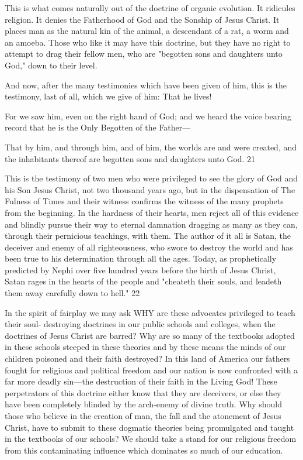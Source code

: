 This is what comes naturally out of the doctrine of organic evolution. It ridicules religion. It
denies the Fatherhood of God and the Sonship of Jesus Christ. It places man as the natural
kin of the animal, a descendant of a rat, a worm and an amoeba. Those who like it may have
this doctrine, but they have no right to attempt to drag their fellow men, who are "begotten
sons and daughters unto God," down to their level.

And now, after the many testimonies which have been given of him, this is the testimony,
last of all, which we give of him: That he lives!

For we saw him, even on the right hand of God; and we heard the voice bearing record that
he is the Only Begotten of the Father—

That by him, and through him, and of him, the worlds are and were created, and the
inhabitants thereof are begotten sons and daughters unto God. 21

This is the testimony of two men who were privileged to see the glory of God and his Son
Jesus Christ, not two thousand years ago, but in the dispensation of The Fulness of Times and
their witness confirms the witness of the many prophets from the beginning. In the hardness
of their hearts, men reject all of this evidence and blindly pursue their way to eternal
damnation dragging as many as they can, through their pernicious teachings, with them. The
author of it all is Satan, the deceiver and enemy of all righteousness, who swore to destroy
the world and has been true to his determination through all the ages. Today, as prophetically
predicted by Nephi over five hundred years before the birth of Jesus Christ, Satan rages in
the hearts of the people and "cheateth their souls, and leadeth them away carefully down to
hell." 22

In the spirit of fairplay we may ask WHY are these advocates privileged to teach their soul-
destroying doctrines in our public schools and colleges, when the doctrines of Jesus Christ
are barred? Why are so many of the textbooks adopted in these schools steeped in these
theories and by these means the minds of our children poisoned and their faith destroyed? In
this land of America our fathers fought for religious and political freedom and our nation is
now confronted with a far more deadly sin—the destruction of their faith in the Living God!
These perpetrators of this doctrine either know that they are deceivers, or else they have been
completely blinded by the arch-enemy of divine truth. Why should those who believe in the
creation of man, the fall and the atonement of Jesus Christ, have to submit to these dogmatic
theories being promulgated and taught in the textbooks of our schools? We should take a
stand for our religious freedom from this contaminating influence which dominates so much
of our education.

